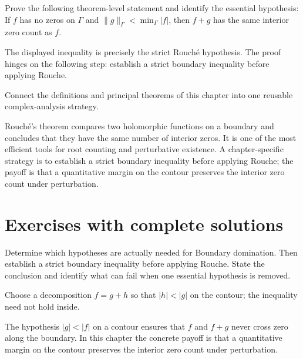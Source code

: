 \begin{problem}\label{prob:iv13-problem-11}
Prove the following theorem-level statement and identify the essential hypothesis: If $f$ has no zeros on $\Gamma$ and $\|g\|_{\Gamma}<\min_{\Gamma}|f|$, then $f+g$ has the same interior zero count as $f$.
\end{problem}
\begin{solution}
The displayed inequality is precisely the strict Rouché hypothesis. The proof hinges on the following step: establish a strict boundary inequality before applying Rouche.
\end{solution}

\begin{problem}\label{prob:iv13-problem-12}
Connect the definitions and principal theorems of this chapter into one reusable complex-analysis strategy.
\end{problem}
\begin{solution}
Rouché's theorem compares two holomorphic functions on a boundary and concludes that they have the same number of interior zeros. It is one of the most efficient tools for root counting and perturbative existence. A chapter-specific strategy is to establish a strict boundary inequality before applying Rouche; the payoff is that a quantitative margin on the contour preserves the interior zero count under perturbation.
\end{solution}

\section{Exercises with complete solutions}

\begin{exercise}\label{exr:iv13-01}
Determine which hypotheses are actually needed for Boundary domination. Then establish a strict boundary inequality before applying Rouche. State the conclusion and identify what can fail when one essential hypothesis is removed.
\end{exercise}
\begin{hint}
Choose a decomposition \(f=g+h\) so that \(|h|<|g|\) on the contour; the inequality need not hold inside.
\end{hint}
\begin{solution}
The hypothesis $|g|<|f|$ on a contour ensures that $f$ and $f+g$ never cross zero along the boundary. In this chapter the concrete payoff is that a quantitative margin on the contour preserves the interior zero count under perturbation.
\end{solution}

